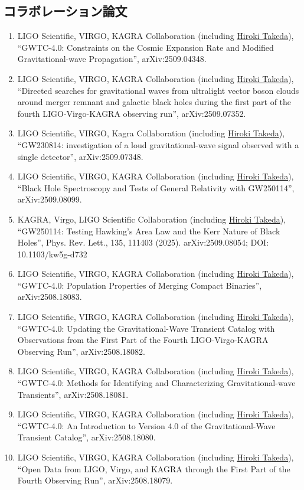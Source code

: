 \documentclass[uplatex, 11pt]{jsarticle}
\begin{document}
\subsection*{コラボレーション論文}
\begin{enumerate}
\item LIGO Scientific, VIRGO, KAGRA Collaboration (including \uline{Hiroki Takeda}), “GWTC-4.0: Constraints on the Cosmic Expansion Rate and Modified Gravitational-wave Propagation”, arXiv:2509.04348.
\item LIGO Scientific, VIRGO, KAGRA Collaboration (including \uline{Hiroki Takeda}), “Directed searches for gravitational waves from ultralight vector boson clouds around merger remnant and galactic black holes during the first part of the fourth LIGO-Virgo-KAGRA observing run”, arXiv:2509.07352.
\item LIGO Scientific, VIRGO, Kagra Collaboration (including \uline{Hiroki Takeda}), “GW230814: investigation of a loud gravitational-wave signal observed with a single detector”, arXiv:2509.07348.
\item LIGO Scientific, VIRGO, KAGRA Collaboration (including \uline{Hiroki Takeda}), “Black Hole Spectroscopy and Tests of General Relativity with GW250114”, arXiv:2509.08099.
\item KAGRA, Virgo, LIGO Scientific Collaboration (including \uline{Hiroki Takeda}), “GW250114: Testing Hawking's Area Law and the Kerr Nature of Black Holes”, Phys. Rev. Lett., 135, 111403 (2025). arXiv:2509.08054; DOI: 10.1103/kw5g-d732
\item LIGO Scientific, VIRGO, KAGRA Collaboration (including \uline{Hiroki Takeda}), “GWTC-4.0: Population Properties of Merging Compact Binaries”, arXiv:2508.18083.
\item LIGO Scientific, VIRGO, KAGRA Collaboration (including \uline{Hiroki Takeda}), “GWTC-4.0: Updating the Gravitational-Wave Transient Catalog with Observations from the First Part of the Fourth LIGO-Virgo-KAGRA Observing Run”, arXiv:2508.18082.
\item LIGO Scientific, VIRGO, KAGRA Collaboration (including \uline{Hiroki Takeda}), “GWTC-4.0: Methods for Identifying and Characterizing Gravitational-wave Transients”, arXiv:2508.18081.
\item LIGO Scientific, VIRGO, KAGRA Collaboration (including \uline{Hiroki Takeda}), “GWTC-4.0: An Introduction to Version 4.0 of the Gravitational-Wave Transient Catalog”, arXiv:2508.18080.
\item LIGO Scientific, VIRGO, KAGRA Collaboration (including \uline{Hiroki Takeda}), “Open Data from LIGO, Virgo, and KAGRA through the First Part of the Fourth Observing Run”, arXiv:2508.18079.

\end{enumerate}
\end{document}
